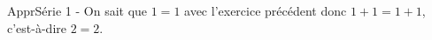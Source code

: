     \setcounter{partie}{0} %
    \partie
    ApprSérie 1 - On sait que $1=1$ avec l’exercice précédent donc $1+1=1+1$,
    c’est-à-dire $2=2$.

    \partie
